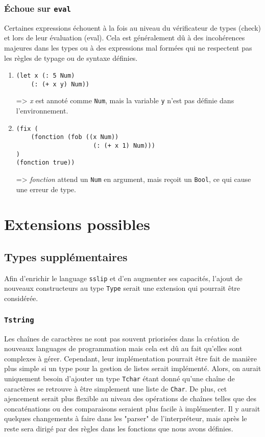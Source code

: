 \documentclass[a4paper,12pt]{article}
\begin{document}
        \subsubsection{Échoue sur \texttt{eval}}
        Certaines expressions échouent à la fois au niveau du vérificateur de types (check) et lors de leur évaluation (eval). 
        Cela est généralement dû à des incohérences majeures dans les types ou à des expressions mal formées qui ne respectent pas 
        les règles de typage ou de syntaxe définies. \\
        \begin{enumerate}
            \item \begin{lstlisting}
(let x (: 5 Num) 
    (: (+ x y) Num))
            \end{lstlisting}
            => \textit{x} est annoté comme \texttt{Num}, mais la variable \texttt{y} n'est pas définie dans l'environnement.
        
            \item \begin{lstlisting}
(fix (
    (fonction (fob ((x Num)) 
                     (: (+ x 1) Num)))
) 
(fonction true))
            \end{lstlisting}
            => \textit{fonction} attend un \texttt{Num} en argument, mais reçoit un \texttt{Bool}, ce qui cause une erreur de type.
        \end{enumerate}


\section{Extensions possibles}
    \subsection{Types supplémentaires}
        Afin d'enrichir le language \texttt{sslip} et d'en augmenter ses capacités, l'ajout de 
        nouveaux constructeurs au type \texttt{Type} serait une extension qui pourrait être 
        considérée.
        \subsubsection{\texttt{Tstring}}
            Les chaînes de caractères ne sont pas souvent priorisées dans la création de nouveaux
            languages de programmation mais cela est dû au fait qu'elles sont complexes à gérer.
            Cependant, leur implémentation pourrait être fait de manière plus simple si un type
            pour la gestion de listes serait implémenté. Alors, on aurait uniquement besoin 
            d'ajouter un type \texttt{Tchar} étant donné qu'une chaîne de caractères se retrouve
            à être simplement une liste de \texttt{Char}. De plus, cet ajencement serait plus
            flexible au niveau des opérations de chaînes telles que des concaténations ou des 
            comparaisons seraient plus facile à implémenter. Il y aurait quelques changements 
            à faire dans les "parser" de l'interpréteur, mais après le reste sera dirigé par 
            des règles dans les fonctions que nous avons définies.
\end{document}
